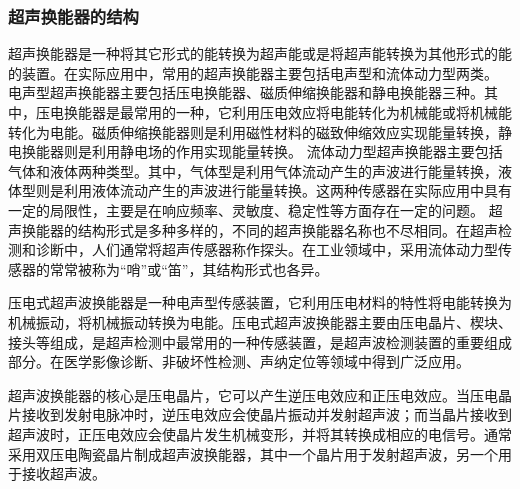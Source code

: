    \subsubsection{超声换能器的结构}
    超声换能器是一种将其它形式的能转换为超声能或是将超声能转换为其他形式的能的装置。在实际应用中，常用的超声换能器主要包括电声型和流体动力型两类。
    电声型超声换能器主要包括压电换能器、磁质伸缩换能器和静电换能器三种。其中，压电换能器是最常用的一种，它利用压电效应将电能转化为机械能或将机械能转化为电能。磁质伸缩换能器则是利用磁性材料的磁致伸缩效应实现能量转换，静电换能器则是利用静电场的作用实现能量转换。
    流体动力型超声换能器主要包括气体和液体两种类型。其中，气体型是利用气体流动产生的声波进行能量转换，液体型则是利用液体流动产生的声波进行能量转换。这两种传感器在实际应用中具有一定的局限性，主要是在响应频率、灵敏度、稳定性等方面存在一定的问题。
    超声换能器的结构形式是多种多样的，不同的超声换能器名称也不尽相同。在超声检测和诊断中，人们通常将超声传感器称作探头。在工业领域中，采用流体动力型传感器的常常被称为“哨”或“笛”，其结构形式也各异。\par
    压电式超声波换能器是一种电声型传感装置，它利用压电材料的特性将电能转换为机械振动，将机械振动转换为电能。压电式超声波换能器主要由压电晶片、楔块、接头等组成，是超声检测中最常用的一种传感装置，是超声波检测装置的重要组成部分。在医学影像诊断、非破坏性检测、声纳定位等领域中得到广泛应用。\par
    超声波换能器的核心是压电晶片，它可以产生逆压电效应和正压电效应。当压电晶片接收到发射电脉冲时，逆压电效应会使晶片振动并发射超声波；而当晶片接收到超声波时，正压电效应会使晶片发生机械变形，并将其转换成相应的电信号。通常采用双压电陶瓷晶片制成超声波换能器，其中一个晶片用于发射超声波，另一个用于接收超声波。
